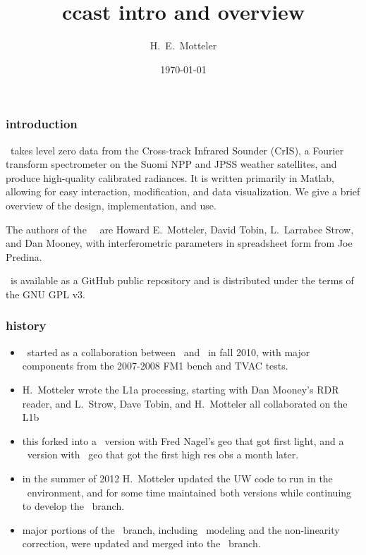 \documentclass[11pt]{beamer}
\title{ccast intro and overview}
\author{H.~E.~Motteler}
\institute{
  UMBC Atmospheric Spectroscopy Lab \\
  Joint Center for Earth Systems Technology \\
}
\date{\today}
\begin{document}
\begin{frame}[plain]
\titlepage
\end{frame}
\begin{frame}
\frametitle{introduction}

\ccast\ takes level zero data from the Cross-track Infrared Sounder
(CrIS), a Fourier transform spectrometer on the Suomi NPP and JPSS
weather satellites, and produce high-quality calibrated radiances.
It is written primarily in Matlab, allowing for easy interaction,
modification, and data visualization.  We give a brief overview of
the design, implementation, and use.

\hspace{2cm}

The authors of the \umbc\ \ccast\ are Howard E.~Motteler, David Tobin,
L.~Larrabee Strow, and Dan Mooney, with interferometric parameters
in spreadsheet form from Joe Predina.

\hspace{2cm}

\ccast\ is available as a GitHub public repository and is distributed
under the terms of the GNU GPL v3.

\end{frame}
\begin{frame}
\frametitle{history}

\begin{itemize}
  \item \ccast\ started as a collaboration between \umbc\ and
    \uw\ in fall 2010, with major components from the 2007-2008 FM1
    bench and TVAC tests.

  \item H.~Motteler wrote the L1a processing, starting with Dan
    Mooney's RDR reader, and L.~Strow, Dave Tobin, and H.~Motteler
    all collaborated on the L1b 

  \item this forked into a \uw\ version with Fred Nagel's geo that
    got first light, and a \umbc\ version with \noaa\ geo that got
    the first high res obs a month later.

  \item in the summer of 2012 H.~Motteler updated the UW code to 
    run in the \umbc\ environment, and for some time maintained both
    versions while continuing to develop the \umbc\ branch.

  \item major portions of the \uw\ branch, including \ict\ modeling
    and the non-linearity correction, were updated and merged into
    the \umbc\ branch.
\end{itemize}


\end{frame}
\end{document}
